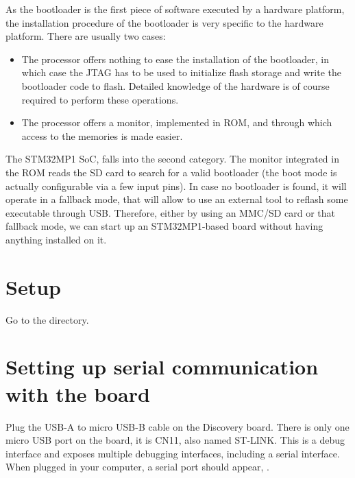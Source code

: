 
As the bootloader is the first piece of software executed by a
hardware platform, the installation procedure of the bootloader is
very specific to the hardware platform. There are usually two cases:

\begin{itemize}

\item The processor offers nothing to ease the installation of the
  bootloader, in which case the JTAG has to be used to initialize
  flash storage and write the bootloader code to flash. Detailed
  knowledge of the hardware is of course required to perform these
  operations.

\item The processor offers a monitor, implemented in ROM, and through
  which access to the memories is made easier.

\end{itemize}

The STM32MP1 SoC, falls into the second category. The monitor
integrated in the ROM reads the SD card to search for a valid
bootloader (the boot mode is actually configurable via a few input
pins). In case no bootloader is found, it will operate in a fallback
mode, that will allow to use an external tool to reflash some
executable through USB. Therefore, either by using an MMC/SD card or
that fallback mode, we can start up an STM32MP1-based board without
having anything installed on it.
\section{Setup}

Go to the  directory.

\section{Setting up serial communication with the board}

Plug the USB-A to micro USB-B cable on the Discovery board. There is
only one micro USB port on the board, it is CN11, also named ST-LINK.
This is a debug interface and exposes multiple debugging interfaces,
including a serial interface. When plugged in your computer, a serial
port should appear, {\tt \hosttty}.

